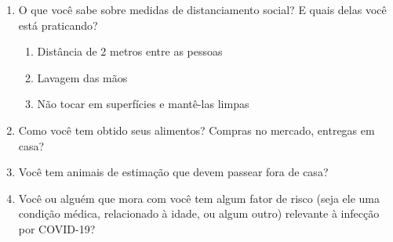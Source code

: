\documentclass[onecolumn,journal]{IEEEtran}
\begin{document}
\begin{multicols}{2}
\begin{enumerate}
  
\item O que você sabe sobre medidas de distanciamento social? E quais delas você está praticando?

  \begin{enumerate}
  \def\labelenumii{\alph{enumii}.}
  \tightlist
  \item Distância de 2 metros entre as pessoas
  \item Lavagem das mãos
  \item Não tocar em superfícies e mantê-las limpas
  \end{enumerate}
  
\item Como você tem obtido seus alimentos? Compras no mercado, entregas em casa?
\item Você tem animais de estimação que devem passear fora de casa?
\item  Você ou alguém que mora com você tem algum fator de risco (seja ele uma condição médica, relacionado à idade, ou algum outro) relevante à infecção por COVID-19?

\end{enumerate}


\end{multicols}


% 
\end{document}
